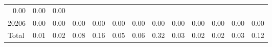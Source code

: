 \begin{table}[!h]
\begin{tabular}{lllllllllllll}
  \multicolumn{1}{r}{0.00} &
  \multicolumn{1}{r}{0.00} &
  \multicolumn{1}{r}{0.00} \\
\multicolumn{1}{l}{\hspace{1em}20206} &
  \multicolumn{1}{|r}{0.00} &
  \multicolumn{1}{r}{0.00} &
  \multicolumn{1}{r}{0.00} &
  \multicolumn{1}{r}{0.00} &
  \multicolumn{1}{r}{0.00} &
  \multicolumn{1}{r}{0.00} &
  \multicolumn{1}{r}{0.00} &
  \multicolumn{1}{r}{0.00} &
  \multicolumn{1}{r}{0.00} &
  \multicolumn{1}{r}{0.00} &
  \multicolumn{1}{r}{0.00} &
  \multicolumn{1}{r}{0.00} \\
\multicolumn{1}{l}{\hspace{1em}Total} &
  \multicolumn{1}{|r}{0.01} &
  \multicolumn{1}{r}{0.02} &
  \multicolumn{1}{r}{0.08} &
  \multicolumn{1}{r}{0.16} &
  \multicolumn{1}{r}{0.05} &
  \multicolumn{1}{r}{0.06} &
  \multicolumn{1}{r}{0.32} &
  \multicolumn{1}{r}{0.03} &
  \multicolumn{1}{r}{0.02} &
  \multicolumn{1}{r}{0.02} &
  \multicolumn{1}{r}{0.03} &
  \multicolumn{1}{r}{0.12} \\
\cline{1-13}
\end{tabular}
\end{table}
